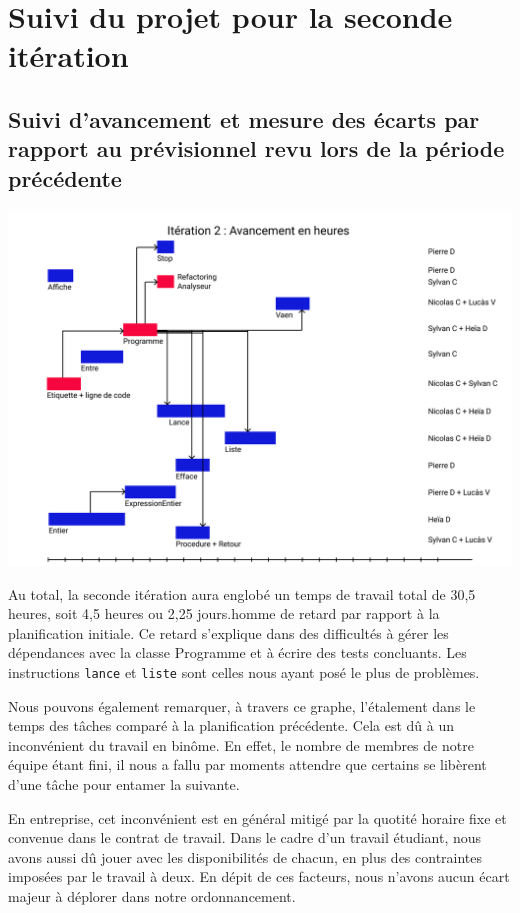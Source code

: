 \section{Suivi du projet pour la seconde itération}


\subsection{Suivi d’avancement et mesure des écarts par rapport au prévisionnel revu lors de la période précédente}

 \includegraphics[scale=0.75]{fichiers/planification/iteration2/iteration2Avancement.png}

Au total, la seconde itération aura englobé un temps de travail total de 30,5 heures,
soit 4,5 heures ou 2,25 jours.homme de retard par rapport à la planification initiale. Ce
retard s'explique dans des difficultés à gérer les dépendances avec la classe Programme
et à écrire des tests concluants. Les instructions \verb|lance| et \verb|liste| sont
celles nous ayant posé le plus de problèmes.

Nous pouvons également remarquer, à travers ce graphe, l'étalement dans le temps
des tâches comparé à la planification précédente. Cela est dû à un inconvénient du
travail en binôme. En effet, le nombre de membres de notre équipe étant fini, il nous
a fallu par moments attendre que certains se libèrent d'une tâche pour entamer la
suivante.

En entreprise, cet inconvénient est en général mitigé par la quotité horaire
fixe et convenue dans le contrat de travail. Dans le cadre d'un travail étudiant, nous
avons aussi dû jouer avec les disponibilités de chacun, en plus des contraintes
imposées par le travail à deux. En dépit de ces facteurs, nous n'avons aucun écart
majeur à déplorer dans notre ordonnancement.

